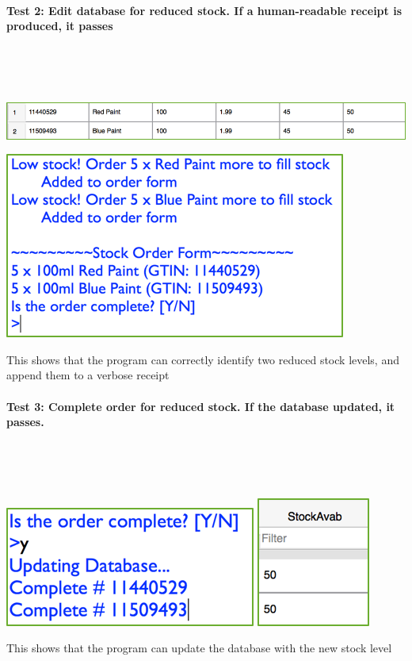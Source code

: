 \documentclass[a4paper]{article}
\begin{document}
\paragraph{Test 2: Edit database for reduced stock. If a human-readable receipt is produced, it passes} ~\par ~\par
\noindent\includegraphics{testing_21.png} \par
\noindent\includegraphics{testing_22.png} \par
This shows that the program can correctly identify two reduced stock levels, and append them to a verbose receipt
\paragraph{Test 3: Complete order for reduced stock. If the database updated, it passes.} ~\par ~\par
\noindent\includegraphics{testing_23.png}
\noindent\includegraphics{testing_24.png} \par
This shows that the program can update the database with the new stock level
\end{document}
